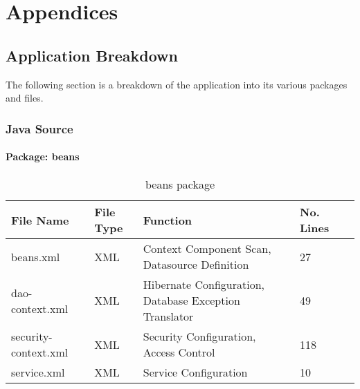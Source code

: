 \chapter{Appendices}
\label{appendices}

\section{Application Breakdown}
\label{sec:appbreakdnown}
The following section is a breakdown of the application into its various packages and files.
\subsection{Java Source}
\subsubsection{Package: beans}
\begin{table}[H]
\begin{center}
    \begin{tabular}{| l | l | l| l |p{1cm} |}
    \hline
    File Name & File Type & Function & No. Lines\\ \hline
    beans.xml & XML & Context Component Scan, Datasource Definition & 27 \\ \hline
	dao-context.xml & XML & Hibernate Configuration, Database Exception Translator & 49 \\ \hline
	security-context.xml & XML & Security Configuration, Access Control & 118 \\ \hline
	service.xml & XML & Service Configuration & 10 \\ \hline
    \end{tabular}
\end{center}
\caption{beans package}
\end{table}

